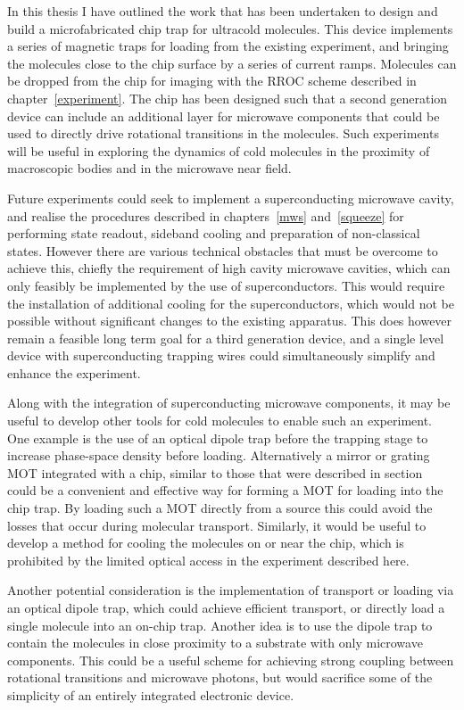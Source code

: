 In this thesis I have outlined the work that has been undertaken to design and
build a microfabricated chip trap for ultracold molecules. This device
implements a series of magnetic traps for loading from the existing \CaF{}
experiment, and bringing the molecules close to the chip surface by a series of
current ramps. Molecules can be dropped from the chip for imaging with the RROC
scheme described in chapter~\ref{experiment}. The chip has been designed such
that a second generation device can include an additional layer for microwave
components that could be used to directly drive rotational transitions in the
molecules. Such experiments will be useful in exploring the dynamics of cold
molecules in the proximity of macroscopic bodies and in the microwave near
field.

Future experiments could seek to implement a superconducting microwave cavity,
and realise the procedures described in chapters~\ref{mws} and~\ref{squeeze}
for performing state readout, sideband cooling and preparation of
non-classical states. However there are various technical obstacles that must
be overcome to achieve this, chiefly the requirement of high cavity microwave
cavities, which can only feasibly be implemented by the use of superconductors.
This would require the installation of additional cooling for the
superconductors, which would not be possible without significant changes to the
existing apparatus. This does however remain a feasible long term goal for a
third generation device, and a single level device with superconducting
trapping wires could simultaneously simplify and enhance the experiment.

Along with the integration of superconducting microwave components, it may be
useful to develop other tools for cold molecules to enable such an experiment.
One example is the use of an optical dipole trap before the trapping stage to
increase phase-space density before loading.  Alternatively a mirror or grating
MOT integrated with a chip, similar to those that were described in
section~ could be a convenient and effective way
for forming a \CaF{} MOT for loading into the chip trap. By loading such a MOT
directly from a source this could avoid the losses that occur during molecular
transport. Similarly, it would be useful to develop a method for cooling the
molecules on or near the chip, which is prohibited by the limited optical
access in the experiment described here.

Another potential consideration is the implementation of transport or loading
via an optical dipole trap, which could achieve efficient transport, or
directly load a single molecule into an on-chip trap. Another idea is to use
the dipole trap to contain the molecules in close proximity to a substrate with
only microwave components. This could be a useful scheme for achieving strong
coupling between rotational transitions and microwave photons, but would
sacrifice some of the simplicity of an entirely integrated electronic device.

